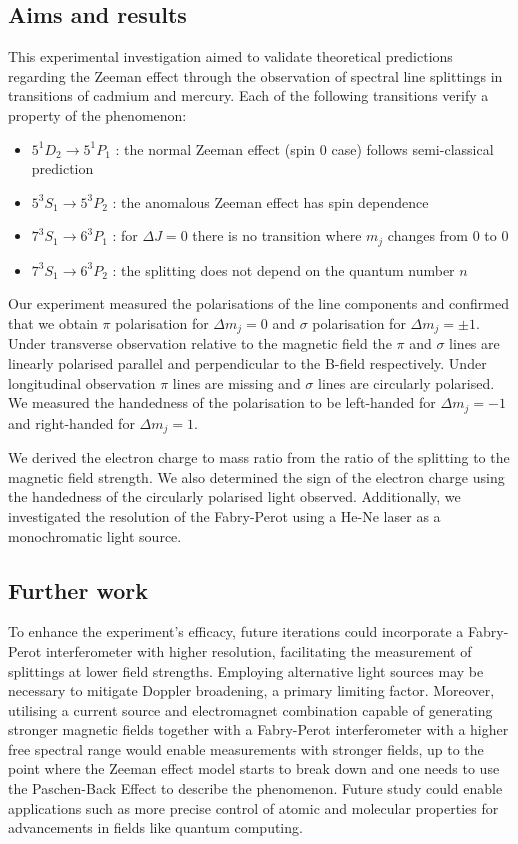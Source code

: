 \documentclass[11pt]{article}
\begin{document}
\subsection{Aims and results}
This experimental investigation aimed to validate theoretical predictions regarding the Zeeman effect through the observation of spectral line splittings in transitions of cadmium and mercury. Each of the following transitions verify a property of the phenomenon: 
\begin{itemize}
    \item $5^1 D_2 \rightarrow 5^1 P_1$ : the normal Zeeman effect (spin 0 case) follows semi-classical prediction
    \item $5^3 S_1 \rightarrow 5^3 P_2$ : the anomalous Zeeman effect has spin dependence
    \item $7^3 S_1 \rightarrow 6^3 P_1$ : for $\Delta J = 0$ there is no transition where $m_j$ changes from 0 to 0
    \item $7^3 S_1 \rightarrow 6^3 P_2$ : the splitting does not depend on the quantum number $n$
\end{itemize}
Our experiment measured the polarisations of the line components and confirmed that we obtain $\pi$ polarisation for $\Delta m_j = 0$ and $\sigma$ polarisation for $\Delta m_j = \pm 1$. Under transverse observation relative to the magnetic field the $\pi$ and $\sigma$ lines are linearly polarised parallel and perpendicular to the B-field respectively. Under longitudinal observation $\pi$ lines are missing and $\sigma$ lines are circularly polarised. We measured the handedness of the polarisation to be left-handed for $\Delta m_j = -1$ and right-handed for $\Delta m_j = 1$. 

We derived the electron charge to mass ratio from the ratio of the splitting to the magnetic field strength. We also determined the sign of the electron charge using the handedness of the circularly polarised light observed. Additionally, we investigated  the resolution of the Fabry-Perot using a He-Ne laser as a monochromatic light source. 

\subsection{Further work}
To enhance the experiment's efficacy, future iterations could incorporate a Fabry-Perot interferometer with higher resolution, facilitating the measurement of splittings at lower field strengths. Employing alternative light sources may be necessary to mitigate Doppler broadening, a primary limiting factor. Moreover, utilising a current source and electromagnet combination capable of generating stronger magnetic fields together with a Fabry-Perot interferometer with a higher free spectral range would enable measurements with stronger fields, up to the point where the Zeeman effect model starts to break down and one needs to use the Paschen-Back Effect to describe the phenomenon. Future study could enable applications such as more precise control of atomic and molecular properties for advancements in fields like quantum computing.
\end{document}
